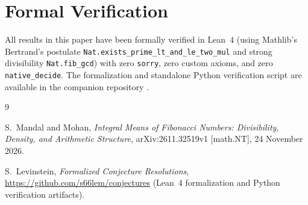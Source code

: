 \documentclass[11pt,a4paper]{article}
\begin{document}
\section{Formal Verification}

All results in this paper have been formally verified in Lean~4 (using Mathlib's Bertrand's postulate \texttt{Nat.exists\_prime\_lt\_and\_le\_two\_mul} and strong divisibility \texttt{Nat.fib\_gcd}) with zero \texttt{sorry}, zero custom axioms, and zero \texttt{native\_decide}. The formalization and standalone Python verification script are available in the companion repository \cite{Repo}.

\begin{thebibliography}{9}
\raggedright
{}
S.~Mandal and Mohan,
\emph{Integral Means of Fibonacci Numbers: Divisibility, Density, and Arithmetic Structure},
arXiv:2611.32519v1 [math.NT], 24 November 2026.

S.~Levinstein,
\emph{Formalized Conjecture Resolutions},
\url{https://github.com/s66lem/conjectures} (Lean~4 formalization and Python verification artifacts).
\end{thebibliography}
\end{document}
